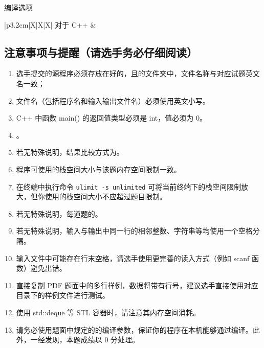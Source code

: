 \documentclass{\string~/.hexagon/assets/statement}
\begin{document}
\begin{titlepage}
  编译选项
  \begin{center}
    \begin{tabularx}{\textwidth}{|p{3.2cm}|X|X|X|}
      \hline
      对于 C++ &  \\
      \hline
    \end{tabularx}\par
  \end{center}

  \begingroup\titleformat{\subsection}{\bf}{}{0pt}{\hspace{0.5em}}\subsection{注意事项与提醒（请选手务必仔细阅读）}\endgroup
  \begin{enumerate}
    \item 选手提交的源程序必须存放在好的，且的文件夹中，文件名称与对应试题英文名一致；
    \item 文件名（包括程序名和输入输出文件名）必须使用英文小写。
    \item C++ 中函数 main() 的返回值类型必须是 int，值必须为 0。
    \item {}。
    \item 若无特殊说明，结果比较方式为。
    \item 程序可使用的栈空间大小与该题内存空间限制一致。
    \item 在终端中执行命令 \texttt{ulimit -s unlimited} 可将当前终端下的栈空间限制放大，但你使用的栈空间大小不应超过题目限制。
    \item 若无特殊说明，每道题的。
    \item 若无特殊说明，输入与输出中同一行的相邻整数、字符串等均使用一个空格分隔。
    \item 输入文件中可能存在行末空格，请选手使用更完善的读入方式（例如 scanf 函数）避免出错。
    \item 直接复制 PDF 题面中的多行样例，数据将带有行号，建议选手直接使用对应目录下的样例文件进行测试。
    \item 使用 std::deque 等 STL 容器时，请注意其内存空间消耗。
    \item 请务必使用题面中规定的的编译参数，保证你的程序在本机能够通过编译。此外，一经发现，本题成绩以 0 分处理。
  \end{enumerate}
\end{titlepage}
\end{document}
